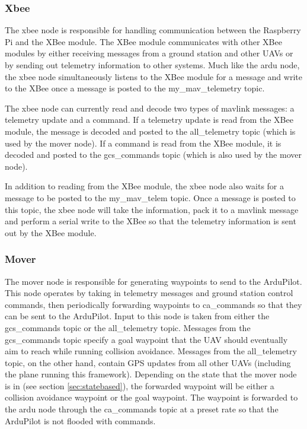 \documentclass[conference]{IEEEtran}
\begin{document}
\subsubsection{Xbee}

The xbee node is responsible for handling communication between the Raspberry Pi and the XBee module.  The XBee module communicates with other XBee modules by either receiving messages from a ground station and other UAVs or by sending out telemetry information to other systems.  Much like the ardu node, the xbee node simultaneously listens to the XBee module for a message and write to the XBee once a message is posted to the my\_mav\_telemetry topic.  

The xbee node can currently read and decode two types of mavlink messages: a telemetry update and a command.  If a telemetry update is read from the XBee module, the message is decoded and posted to the all\_telemetry topic (which is used by the mover node). If a command is read from the XBee module, it is decoded and posted to the gcs\_commands topic (which is also used by the mover node).  

In addition to reading from the XBee module, the xbee node also waits for a message to be posted to the my\_mav\_telem topic.  Once a message is posted to this topic, the xbee node will take the information, pack it to a mavlink message and perform a serial write to the XBee so that the telemetry information is sent out by the XBee module.


\subsubsection{Mover}
The mover node is responsible for generating waypoints to send to the ArduPilot. 
This node operates by taking in telemetry messages and ground station control commands, then periodically forwarding waypoints to ca\_commands so that they can be sent to the ArduPilot.  Input to this node is taken from either the gcs\_commands topic or the all\_telemetry topic.  Messages from the gcs\_commands topic specify a goal waypoint that the UAV should eventually aim to reach while running collision avoidance.  Messages from the all\_telemetry topic, on the other hand, contain GPS updates from all other UAVs (including the plane running this framework). Depending on the state that the mover node is in (see section \ref{sec:statebased}), the forwarded waypoint will be either a collision avoidance waypoint or the goal waypoint. 
The waypoint is forwarded to the ardu node through the ca\_commands topic at a preset rate so that the ArduPilot is not flooded with commands.
\end{document}

